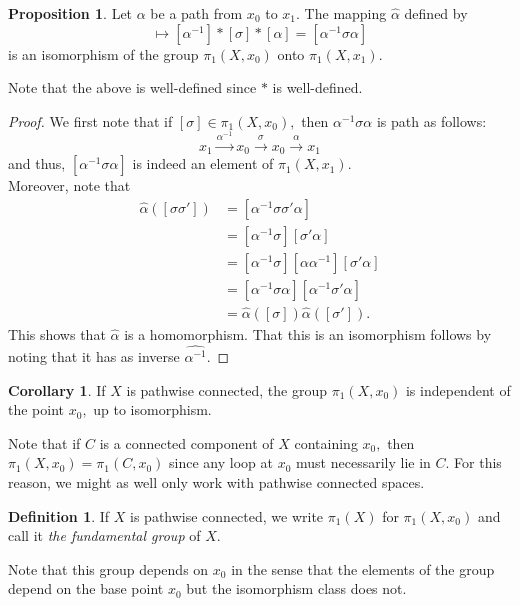 \documentclass[12pt]{article}
\theoremstyle{definition}
\numberwithin{thm}{section}
\newtheorem{defn}[thm]{Definition}
\newtheorem{prop}[thm]{Proposition}
\newtheorem{cor}[thm]{Corollary}
\begin{document}
\begin{prop}
	Let $\alpha$ be a path from $x_0$ to $x_1.$ The mapping $\widehat{\alpha}$ defined by
	\begin{equation*} 
		[\sigma] \mapsto [\alpha^{-1}]*[\sigma]*[\alpha] = [\alpha^{-1}\sigma\alpha]
	\end{equation*}
	is an isomorphism of the group $\pi_1(X, x_0)$ onto $\pi_1(X, x_1).$
\end{prop}
Note that the above is well-defined since $*$ is well-defined.
\begin{proof} 
	We first note that if $[\sigma] \in \pi_1(X, x_0),$ then $\alpha^{-1}\sigma\alpha$ is path as follows:
	\begin{equation*} 
		x_1 \overset{\alpha^{-1}}{\longrightarrow} x_0 \overset{\sigma}{\longrightarrow} x_0 \overset{\alpha}{\longrightarrow} x_1
	\end{equation*}
	and thus, $[\alpha^{-1}\sigma\alpha]$ is indeed an element of $\pi_1(X, x_1).$\\
	Moreover, note that
	\begin{align*} 
		\widehat{\alpha}([\sigma\sigma']) &= [\alpha^{-1}\sigma\sigma'\alpha]\\
		&= [\alpha^{-1}\sigma][\sigma'\alpha]\\
		&= [\alpha^{-1}\sigma][\alpha\alpha^{-1}][\sigma'\alpha]\\
		&= [\alpha^{-1}\sigma\alpha][\alpha^{-1}\sigma'\alpha]\\
		&= \widehat{\alpha}([\sigma])\widehat{\alpha}([\sigma']).
	\end{align*}
	This shows that $\widehat{\alpha}$ is a homomorphism. That this is an isomorphism follows by noting that it has as inverse $\widehat{\alpha^{-1}}.$
\end{proof}
\begin{cor}
	If $X$ is pathwise connected, the group $\pi_1(X, x_0)$ is independent of the point $x_0,$ up to isomorphism.
\end{cor}
Note that if $C$ is a connected component of $X$ containing $x_0,$ then $\pi_1(X, x_0) = \pi_1(C, x_0)$ since any loop at $x_0$ must necessarily lie in $C.$ For this reason, we might as well only work with pathwise connected spaces.
\begin{defn}
	If $X$ is pathwise connected, we write $\pi_1(X)$ for $\pi_1(X, x_0)$ and call it \emph{the fundamental group} of $X.$
\end{defn}
Note that this group depends on $x_0$ in the sense that the elements of the group depend on the base point $x_0$ but the isomorphism class does not.\\
\end{document}
